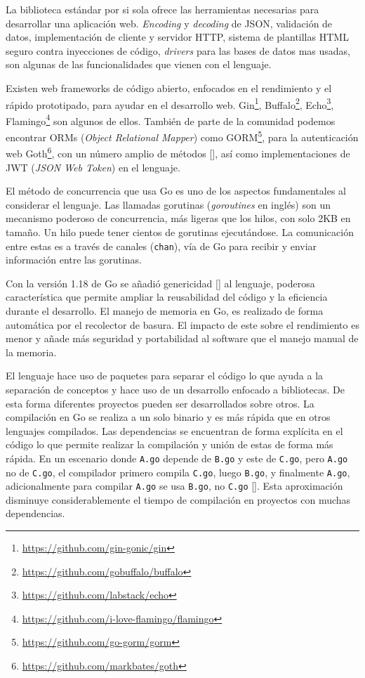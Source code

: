 La biblioteca estándar por si sola ofrece las herramientas necesarias para desarrollar una aplicación web. \textit{Encoding} y \textit{decoding} de JSON, validación de datos, implementación de cliente y servidor HTTP, sistema de plantillas HTML seguro contra inyecciones de código, \textit{drivers} para las bases de datos mas usadas, son algunas de las funcionalidades que vienen con el lenguaje.

Existen web frameworks de código abierto, enfocados en el rendimiento y el rápido prototipado, para ayudar en el desarrollo web. Gin\footnote{\url{https://github.com/gin-gonic/gin}}, Buffalo\footnote{\url{https://github.com/gobuffalo/buffalo}}, Echo\footnote{\url{https://github.com/labstack/echo}}, Flamingo\footnote{\url{https://github.com/i-love-flamingo/flamingo}} son algunos de ellos. También de parte de la comunidad podemos encontrar ORMs (\textit{Object Relational Mapper}) como GORM\footnote{\url{https://github.com/go-gorm/gorm}}, para la autenticación web Goth\footnote{\url{https://github.com/markbates/goth}}, con un número amplio de métodos [\cite{goth}], así como implementaciones de JWT (\textit{JSON Web Token}) en el lenguaje.

El método de concurrencia que usa Go es uno de los aspectos fundamentales al considerar el lenguaje. Las llamadas gorutinas (\textit{goroutines} en inglés) son un mecanismo poderoso de concurrencia, más ligeras que los hilos, con solo 2KB en tamaño. Un hilo puede tener cientos de gorutinas ejecutándose. La comunicación entre estas es a través de canales (\verb+chan+), vía de Go para recibir y enviar información entre las gorutinas.

Con la versión 1.18 de Go se añadió genericidad [\cite{go-generics}] al lenguaje, poderosa característica que permite ampliar la reusabilidad del código y la eficiencia durante el desarrollo. El manejo de memoria en Go, es realizado de forma automática por el recolector de basura. El impacto de este sobre el rendimiento es menor y añade más seguridad y portabilidad al software que el manejo manual de la memoria.

El lenguaje hace uso de paquetes para separar el código lo que ayuda a la separación de conceptos y hace uso de un desarrollo enfocado a bibliotecas. De esta forma diferentes proyectos pueden ser desarrollados sobre otros. La compilación en Go se realiza a un solo binario y es más rápida que en otros lenguajes compilados. Las dependencias se encuentran de forma explícita en el código lo que permite realizar la compilación y unión de estas de forma más rápida. En un escenario donde \verb+A.go+ depende de \verb+B.go+ y este de \verb+C.go+, pero \verb+A.go+ no de \verb+C.go+, el compilador primero compila \verb+C.go+, luego \verb+B.go+, y finalmente \verb+A.go+, adicionalmente para compilar \verb+A.go+ se usa \verb+B.go+, no \verb+C.go+ [\cite{go-deps}]. Esta aproximación disminuye considerablemente el tiempo de compilación en proyectos con muchas dependencias.

